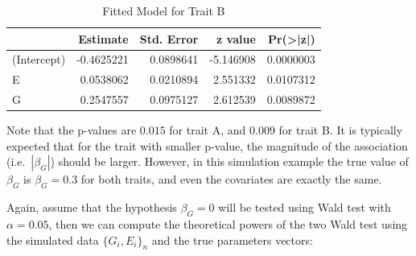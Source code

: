 \documentclass[
]{article}
\begin{document}
\begin{table}[H]

\caption{\label{tab:unnamed-chunk-1}Fitted Model for Trait B}
\centering
\fontsize{10}{12}\selectfont
\begin{tabular}[t]{l|r|r|r|r}
\hline
  & Estimate & Std. Error & z value & Pr(>|z|)\\
\hline
(Intercept) & -0.4625221 & 0.0898641 & -5.146908 & 0.0000003\\
\hline
E & 0.0538062 & 0.0210894 & 2.551332 & 0.0107312\\
\hline
G & 0.2547557 & 0.0975127 & 2.612539 & 0.0089872\\
\hline
\end{tabular}
\end{table}

Note that the p-values are \(0.015\) for trait A, and \(0.009\) for
trait B. It is typically expected that for the trait with smaller
p-value, the magnitude of the association (i.e.~\(|\beta_G|\)) should be
larger. However, in this simulation example the true value of
\(\beta_G\) is \(\beta_G=0.3\) for both traits, and even the covariates
are exactly the same.

Again, assume that the hypothesis \(\beta_G = 0\) will be tested using
Wald test with \(\alpha=0.05\), then we can compute the theoretical
powers of the two Wald test using the simulated data \(\{G_i,E_i\}_n\)
and the true parameters vectors:
\end{document}
